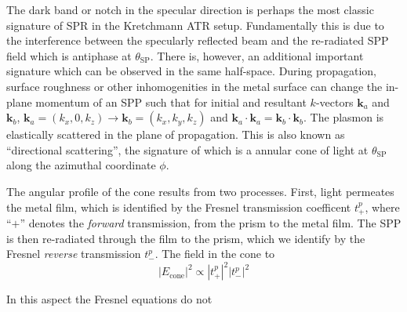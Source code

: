 The dark band or notch in the specular direction is perhaps the most
classic signature of SPR in the Kretchmann ATR setup.  Fundamentally this
is due to the interference between the specularly reflected beam and the
re-radiated SPP field which is antiphase at $\theta_\mathrm{SP}$.  There
is, however, an additional important signature which can be observed in the
same half-space.  During propagation, surface roughness or other
inhomogenities in the metal surface can change the in-plane momentum of an
SPP such that for initial and resultant $k$-vectors $\mathbf{k}_a$ and
$\mathbf{k}_b$, $\mathbf{k}_a = (k_x,0,k_z) \to \mathbf{k}_b =
(k_x,k_y,k_z)$ and $\mathbf{k}_a\cdot\mathbf{k}_a =
\mathbf{k}_b\cdot\mathbf{k}_b$.  The plasmon is elastically scattered in
the plane of propagation.  This is also known as ``directional
scattering'', the signature of which is a annular cone of light at
$\theta_\mathrm{SP}$ along the azimuthal coordinate $\phi$.

The angular profile of the cone results from two processes.  First, light
permeates the metal film, which is identified by the Fresnel transmission
coefficent $t^p_+$, where ``$+$'' denotes the \textit{forward}
transmission, from the prism to the metal film.  The SPP is then
re-radiated through the film to the prism, which we identify by the Fresnel
\textit{reverse} transmission $t^p_-$.  The field in the cone 
to 
\begin{equation}
|E_\mathrm{cone}|^2 \propto	|t^p_+|^2 |t^p_-|^2
\end{equation}

In this aspect the Fresnel equations do not 


